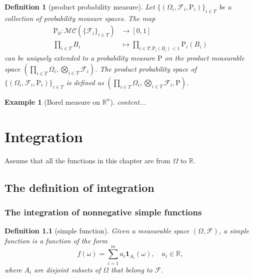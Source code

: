 \documentclass{report}
\newtheorem{definition}{Definition}[section]
\newtheorem{example}{Example}[section]
\theoremstyle{nonumberplain}
\begin{document}
\begin{definition}[product probability measure]
	Let $\{(\Omega_i,\mathcal{F}_i,\mathrm{P}_i)\}_{i\in T}$ be a collection of probability measure spaces. 
	The map 
	\begin{align*}
	\mathrm{P}_0: \mathcal{MC}(\{\mathcal{F}_i\}_{i\in T})&\longrightarrow[0,1]\\
	\prod_{i\in T}B_i&\longmapsto\prod_{i\in T: \mathrm{P}_i(B_i)<1}\mathrm{P}_i\left(B_i\right)
	\end{align*}
	can be uniquely extended to a probability measure $\mathrm{P}$ on the product measurable space $\left(\prod_{i\in T}\Omega_i,\bigotimes_{i\in T}\mathcal{F}_i\right)$. The \emph{product probability space} of $\{(\Omega_i,\mathcal{F}_i,\mathrm{P}_i)\}_{i\in T}$ is defined as $\left(\prod_{i\in T}\Omega_i,\bigotimes_{i\in T}\mathcal{F}_i,\mathrm{P}\right)$.
\end{definition}

\begin{example}[Borel measure on $\mathbb{R}^n$]
	content...
\end{example}


\chapter{Integration}
Assume that all the functions in this chapter are from $\Omega$ to $\mathbb{R}$.
\section{The definition of integration}
\subsection{The integration of nonnegative simple functions}
\begin{definition}[simple function]
	Given a measurable space $(\Omega, \mathcal{F})$, a simple function is a function of the form
	\[
	f(\omega)=\sum_{i=1}^ma_i\mathbf{1}_{A_i}(\omega),\quad a_i\in\mathbb{R},
	\]
	where $A_i$ are disjoint subsets
	of $\Omega$ that belong to $\mathcal{F}$.
\end{definition}
\end{document}
